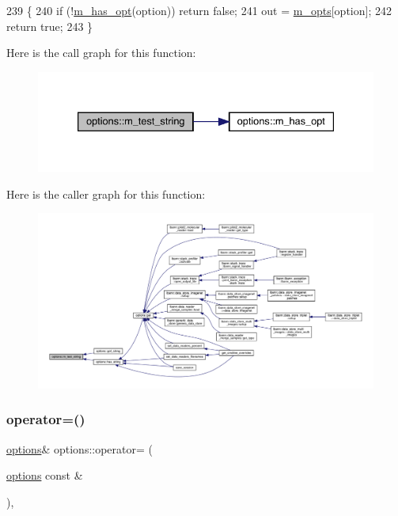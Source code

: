 \begin{DoxyCode}
239 \{
240   \textcolor{keywordflow}{if} (!\hyperlink{classoptions_a99183ba43c8d7b35dbfa1bea0f43db48}{m\_has\_opt}(option)) \textcolor{keywordflow}{return} \textcolor{keyword}{false};
241   out = \hyperlink{classoptions_ac73507ca925d98ee5ff6f04937dff5c3}{m\_opts}[option];
242   \textcolor{keywordflow}{return} \textcolor{keyword}{true};
243 \}
\end{DoxyCode}
Here is the call graph for this function\+:\nopagebreak
\begin{figure}[H]
\begin{center}
\leavevmode
\includegraphics[width=333pt]{classoptions_a8286a8617eec86a3d4cf678bd17739ba_cgraph}
\end{center}
\end{figure}
Here is the caller graph for this function\+:\nopagebreak
\begin{figure}[H]
\begin{center}
\leavevmode
\includegraphics[width=350pt]{classoptions_a8286a8617eec86a3d4cf678bd17739ba_icgraph}
\end{center}
\end{figure}
\mbox{\label{classoptions_ad3323d598a23707733c16be8a575c270}} 
\subsubsection{\texorpdfstring{operator=()}{operator=()}}
{\footnotesize\ttfamily \hyperlink{classoptions}{options}\& options\+::operator= (\begin{DoxyParamCaption}\item[{\hyperlink{classoptions}{options} const \&}]{ }\end{DoxyParamCaption})\hspace{0.3cm}{\ttfamily [inline]}, {\ttfamily [private]}}



